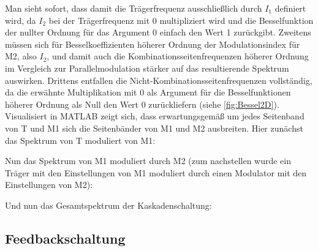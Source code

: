Man sieht sofort, dass damit die Trägerfrequenz ausschließlich durch $ I_1 $ definiert wird, da $ I_2 $ bei der Trägerfrequenz mit 0 multipliziert wird und die Besselfunktion der nullter Ordnung für das Argument 0 einfach den Wert 1 zurückgibt. Zweitens müssen sich für Besselkoeffizienten höherer Ordnung der Modulationsindex für M2, also $ I_2 $, und damit auch die Kombinationsseitenfrequenzen höherer Ordnung im Vergleich zur Parallelmodulation stärker auf das resultierende Spektrum auswirken. Drittens entfallen die Nicht-Kombinationsseitenfrequenzen vollständig, da die erwähnte Multiplikation mit 0 als Argument für die Besselfunktionen höherer Ordnung als Null den Wert 0 zurückliefern (siehe \ref{fig:Bessel2D}). Visualisiert in MATLAB zeigt sich, dass erwartungsgemäß um jedes Seitenband von T und M1 sich die Seitenbänder von M1 und M2 ausbreiten. Hier zunächst das Spektrum von T moduliert von M1:

Nun das Spektrum von M1 moduliert durch M2 (zum nachstellen wurde ein Träger mit den Einstellungen von M1 moduliert durch einen Modulator mit den Einstellungen von M2):

Und nun das Gesamtspektrum der Kaskadenschaltung:

\subsection{Feedbackschaltung}

